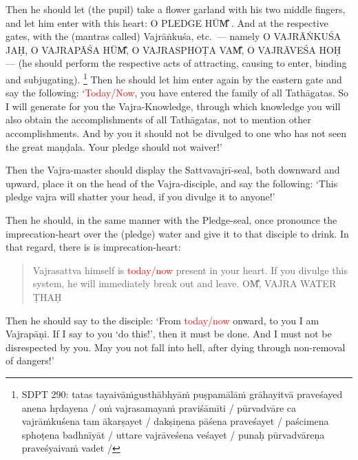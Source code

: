 \documentclass[11pt]{book}
\makeatletter
\def\fakesc#1{%
  \begingroup%
  \xdef\fake@name{\csname\curr@fontshape/\f@size\endcsname}%
  \fontsize{1.3\fontdimen8\fake@name}{\baselineskip}\selectfont%
  \uppercase{#1}%
  \endgroup%
}
\newcommand{\mantra}[1]{\fakesc{#1}}
\newcommand{\red}[1]{\textcolor{red}{#1}}
\makeatother
\begin{document}
Then he should let (the pupil) take a flower garland with his two middle fingers, and let him enter with this heart: \mantra{o pledge hūm̐}. And at the respective gates, with the (mantras called) Vajrāṅkuśa, etc.\ — namely \mantra{o vajrāṅkuśa jaḥ, o vajrapāśa hūm̐,  o vajrasphoṭa vam̐, o vajrāveśa hoḥ} — (he should perform the respective acts of attracting, causing to enter, binding and subjugating). \footnote{SDPT 290: 
tatas tayaivāṁgusthābhyāṁ puṣpamālāṁ grāhayitvā praveśayed anena hṛdayena / oṁ vajrasamayaṁ praviśāmīti / pūrvadvāre ca vajrāṁkuśena tam ākarṣayet / dakṣiṇena pāśena praveśayet / paścimena sphoṭena badhnīyāt / uttare vajrāveśena veśayet / punaḥ pūrvadvāreṇa praveśyaivaṁ vadet /} Then he should let him enter again by the eastern gate and say the following: `\red{Today/Now}, you have entered the family of all Tathāgatas. So I will generate for you the Vajra-Knowledge, through which knowledge you will also obtain the accomplishments of all Tathāgatas, not to mention other accomplishments. And by you it should not be divulged to one who has not seen the great maṇḍala. Your pledge should not waiver!'

Then the Vajra-master should display the Sattvavajrī-seal, both downward and upward, place it on the head of the Vajra-disciple, and say the following: `This pledge vajra will shatter your head, if you divulge it to anyone!'

Then he should, in the same manner with the Pledge-seal, once pronounce the imprecation-heart over the (pledge) water and give it to that disciple to drink. In that regard, there is is imprecation-heart:
 
\begin{verse}
Vajrasattva himself is \red{today/now} present in your heart. If you divulge this system, he will immediately break out and leave. \mantra{om̐, vajra water ṭhaḥ}
\end{verse}

Then he should say to the disciple: `From \red{today/now} onward, to you I am Vajrapāṇi. If I say to you `do this!', then it must be done. And I must not be disrespected by you. May you not fall into hell, after dying through non-removal of dangers!'
\end{document}
